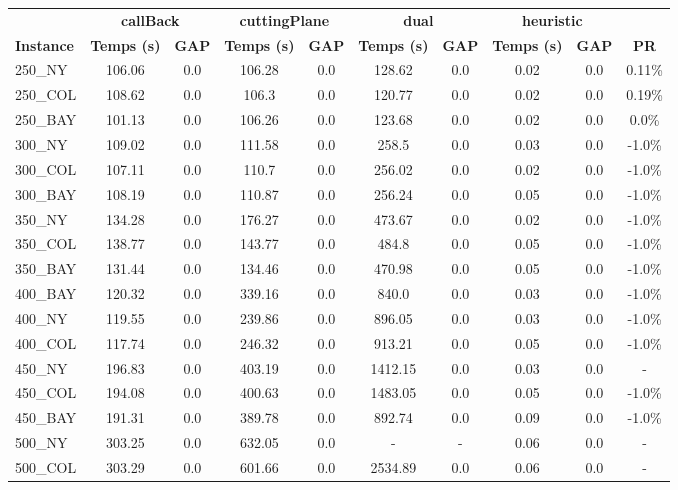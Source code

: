 \documentclass[main.tex]{subfiles}
\begin{document}
\begin{center}
\renewcommand{\arraystretch}{1.4} 
 \begin{tabular}{lccccccccc}
	\hline
 & \multicolumn{2}{c}{\textbf{callBack}} & \multicolumn{2}{c}{\textbf{cuttingPlane}} & \multicolumn{2}{c}{\textbf{dual}} & \multicolumn{2}{c}{\textbf{heuristic}}\\
\textbf{Instance}  & \textbf{Temps (s)} & \textbf{GAP} & \textbf{Temps (s)} & \textbf{GAP} & \textbf{Temps (s)} & \textbf{GAP} & \textbf{Temps (s)} & \textbf{GAP} & \textbf{PR} \\\hline

250\_NY & 106.06 & 0.0 & 106.28 & 0.0 & 128.62 & 0.0 & 0.02 & 0.0 & 0.11\%\\
250\_COL & 108.62 & 0.0 & 106.3 & 0.0 & 120.77 & 0.0 & 0.02 & 0.0 & 0.19\%\\
250\_BAY & 101.13 & 0.0 & 106.26 & 0.0 & 123.68 & 0.0 & 0.02 & 0.0 & 0.0\%\\
300\_NY & 109.02 & 0.0 & 111.58 & 0.0 & 258.5 & 0.0 & 0.03 & 0.0 & -1.0\%\\
300\_COL & 107.11 & 0.0 & 110.7 & 0.0 & 256.02 & 0.0 & 0.02 & 0.0 & -1.0\%\\
300\_BAY & 108.19 & 0.0 & 110.87 & 0.0 & 256.24 & 0.0 & 0.05 & 0.0 & -1.0\%\\
350\_NY & 134.28 & 0.0 & 176.27 & 0.0 & 473.67 & 0.0 & 0.02 & 0.0 & -1.0\%\\
350\_COL & 138.77 & 0.0 & 143.77 & 0.0 & 484.8 & 0.0 & 0.05 & 0.0 & -1.0\%\\
350\_BAY & 131.44 & 0.0 & 134.46 & 0.0 & 470.98 & 0.0 & 0.05 & 0.0 & -1.0\%\\
400\_BAY & 120.32 & 0.0 & 339.16 & 0.0 & 840.0 & 0.0 & 0.03 & 0.0 & -1.0\%\\
400\_NY & 119.55 & 0.0 & 239.86 & 0.0 & 896.05 & 0.0 & 0.03 & 0.0 & -1.0\%\\
400\_COL & 117.74 & 0.0 & 246.32 & 0.0 & 913.21 & 0.0 & 0.05 & 0.0 & -1.0\%\\
450\_NY & 196.83 & 0.0 & 403.19 & 0.0 & 1412.15 & 0.0 & 0.03 & 0.0 & - \\
450\_COL & 194.08 & 0.0 & 400.63 & 0.0 & 1483.05 & 0.0 & 0.05 & 0.0 & -1.0\%\\
450\_BAY & 191.31 & 0.0 & 389.78 & 0.0 & 892.74 & 0.0 & 0.09 & 0.0 & -1.0\%\\
500\_NY & 303.25 & 0.0 & 632.05 & 0.0 & - & - 
 & 0.06 & 0.0 & - \\
500\_COL & 303.29 & 0.0 & 601.66 & 0.0 & 2534.89 & 0.0 & 0.06 & 0.0 & - \\

\end{tabular}
\end{center}
\end{document}

